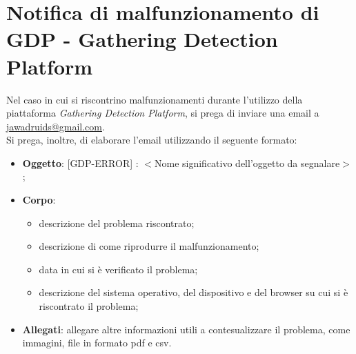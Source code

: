 \chapter{Notifica di malfunzionamento di GDP - Gathering Detection Platform}\label{NotificaDiMalfunzionamentoDiGDPGatheringDetecionPlatform}

Nel caso in cui si riscontrino malfunzionamenti durante l'utilizzo della piattaforma \textit{Gathering Detection Platform}, si prega di inviare una email a \href{mailto:jawadruids@gmail.com}{ jawadruids@gmail.com}. \\
Si prega, inoltre, di elaborare l'email utilizzando il seguente formato: 
\begin{itemize}
	\item \textbf{Oggetto}: [GDP-ERROR] : $<$Nome significativo dell'oggetto da segnalare$>$;
	\item \textbf{Corpo}:
	\begin{itemize}
		\item descrizione del problema riscontrato;
		\item descrizione di come riprodurre il malfunzionamento;
		\item data in cui si è verificato il problema;
		\item descrizione del sistema operativo, del dispositivo e del browser su cui si è riscontrato il problema;
	\end{itemize}
	\item \textbf{Allegati}: allegare altre informazioni utili a contesualizzare il problema, come immagini, file in formato pdf e csv.
\end{itemize}
